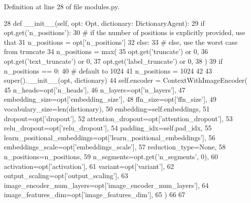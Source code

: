 Definition at line 28 of file modules.\+py.


\begin{DoxyCode}
28     \textcolor{keyword}{def }\_\_init\_\_(self, opt: Opt, dictionary: DictionaryAgent):
29         \textcolor{keywordflow}{if} opt.get(\textcolor{stringliteral}{'n\_positions'}):
30             \textcolor{comment}{# if the number of positions is explicitly provided, use that}
31             n\_positions = opt[\textcolor{stringliteral}{'n\_positions'}]
32         \textcolor{keywordflow}{else}:
33             \textcolor{comment}{# else, use the worst case from truncate}
34             n\_positions = max(
35                 opt.get(\textcolor{stringliteral}{'truncate'}) \textcolor{keywordflow}{or} 0,
36                 opt.get(\textcolor{stringliteral}{'text\_truncate'}) \textcolor{keywordflow}{or} 0,
37                 opt.get(\textcolor{stringliteral}{'label\_truncate'}) \textcolor{keywordflow}{or} 0,
38             )
39             \textcolor{keywordflow}{if} n\_positions == 0:
40                 \textcolor{comment}{# default to 1024}
41                 n\_positions = 1024
42 
43         super().\_\_init\_\_(opt, dictionary)
44         self.encoder = ContextWithImageEncoder(
45             n\_heads=opt[\textcolor{stringliteral}{'n\_heads'}],
46             n\_layers=opt[\textcolor{stringliteral}{'n\_layers'}],
47             embedding\_size=opt[\textcolor{stringliteral}{'embedding\_size'}],
48             ffn\_size=opt[\textcolor{stringliteral}{'ffn\_size'}],
49             vocabulary\_size=len(dictionary),
50             embedding=self.embeddings,
51             dropout=opt[\textcolor{stringliteral}{'dropout'}],
52             attention\_dropout=opt[\textcolor{stringliteral}{'attention\_dropout'}],
53             relu\_dropout=opt[\textcolor{stringliteral}{'relu\_dropout'}],
54             padding\_idx=self.pad\_idx,
55             learn\_positional\_embeddings=opt[\textcolor{stringliteral}{'learn\_positional\_embeddings'}],
56             embeddings\_scale=opt[\textcolor{stringliteral}{'embeddings\_scale'}],
57             reduction\_type=\textcolor{keywordtype}{None},
58             n\_positions=n\_positions,
59             n\_segments=opt.get(\textcolor{stringliteral}{'n\_segments'}, 0),
60             activation=opt[\textcolor{stringliteral}{'activation'}],
61             variant=opt[\textcolor{stringliteral}{'variant'}],
62             output\_scaling=opt[\textcolor{stringliteral}{'output\_scaling'}],
63             image\_encoder\_num\_layers=opt[\textcolor{stringliteral}{'image\_encoder\_num\_layers'}],
64             image\_features\_dim=opt[\textcolor{stringliteral}{'image\_features\_dim'}],
65         )
66 
67 
\end{DoxyCode}


